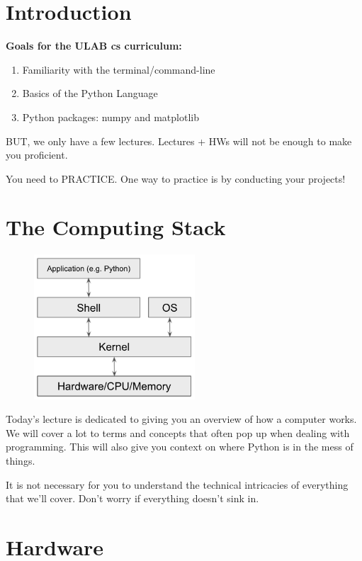 \documentclass[12pt]{article}
\numberwithin{equation}{section}
\begin{document}

\section{Introduction}
\textbf{Goals for the ULAB cs curriculum:}
\begin{enumerate}
    \item Familiarity with the terminal/command-line
    \item Basics of the Python Language
    \item Python packages: numpy and matplotlib
\end{enumerate}

BUT, we only have a few lectures. Lectures + HWs will not be enough to make you proficient. 

You need to PRACTICE. One way to practice is by conducting your projects!

\section{The Computing Stack}

\begin{figure}[H]
	\centering
	\includegraphics[width=6cm] {stack.png}
\end{figure}

Today's lecture is dedicated to giving you an overview of how a computer works. We will cover a lot to terms and concepts that often pop up when dealing with programming. This will also give you context on where Python is in the mess of things.

It is not necessary for you to understand the technical intricacies of everything that we'll cover. Don't worry if everything doesn't sink in.

\section{Hardware}
\end{document}
